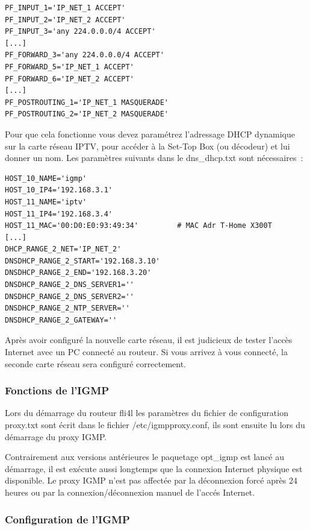 \begin{example}
\begin{verbatim}
PF_INPUT_1='IP_NET_1 ACCEPT'
PF_INPUT_2='IP_NET_2 ACCEPT'
PF_INPUT_3='any 224.0.0.0/4 ACCEPT'
[...]
PF_FORWARD_3='any 224.0.0.0/4 ACCEPT'
PF_FORWARD_5='IP_NET_1 ACCEPT'
PF_FORWARD_6='IP_NET_2 ACCEPT'
[...]
PF_POSTROUTING_1='IP_NET_1 MASQUERADE'
PF_POSTROUTING_2='IP_NET_2 MASQUERADE'
\end{verbatim}
\end{example}

Pour que cela fonctionne vous devez paramétrez l'adressage DHCP dynamique sur la carte réseau IPTV,
pour  accéder à la Set-Top Box (ou décodeur) et lui donner un nom. Les paramètres suivants dans
le dns\_dhcp.txt sont nécessaires~: \\

\begin{example}
\begin{verbatim}
HOST_10_NAME='igmp'
HOST_10_IP4='192.168.3.1'
HOST_11_NAME='iptv'
HOST_11_IP4='192.168.3.4'
HOST_11_MAC='00:D0:E0:93:49:34'         # MAC Adr T-Home X300T
[...]
DHCP_RANGE_2_NET='IP_NET_2'
DNSDHCP_RANGE_2_START='192.168.3.10'
DNSDHCP_RANGE_2_END='192.168.3.20'
DNSDHCP_RANGE_2_DNS_SERVER1=''
DNSDHCP_RANGE_2_DNS_SERVER2=''
DNSDHCP_RANGE_2_NTP_SERVER=''
DNSDHCP_RANGE_2_GATEWAY=''
\end{verbatim}
\end{example}

Après avoir configuré la nouvelle carte réseau, il est judicieux de tester l'accès Internet
avec un PC connecté au routeur. Si vous arrivez à vous connecté, la seconde carte réseau sera
configuré correctement.

\subsubsection{Fonctions de l'IGMP}

Lors du démarrage du routeur fli4l les paramètres du fichier de configuration proxy.txt sont
écrit dans le fichier /etc/igmpproxy.conf, ils sont ensuite lu lors du démarrage du proxy IGMP.

Contrairement aux versions antérieures le paquetage opt\_igmp est lancé au démarrage, il est
exécute aussi longtemps que la connexion Internet physique est disponible. Le proxy IGMP n'est
pas affectée par la déconnexion forcé après 24 heures ou par la connexion/déconnexion manuel
de l'accés Internet.

\subsubsection{Configuration de l'IGMP}

